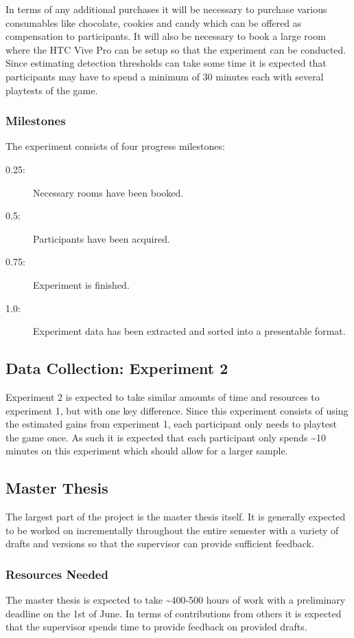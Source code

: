In terms of any additional purchases it will be necessary to purchase various consumables like chocolate, cookies and candy which can be offered as compensation to participants. It will also be necessary to book a large room where the HTC Vive Pro can be setup so that the experiment can be conducted. Since estimating detection thresholds can take some time it is expected that participants may have to spend a minimum of 30 minutes each with several playtests of the game.  

\subsubsection{Milestones}
The experiment consists of four progress milestones:

\begin{description}
\item[0.25: ] Necessary rooms have been booked.
\item[0.5: ] Participants have been acquired.
\item[0.75: ] Experiment is finished.
\item[1.0: ] Experiment data has been extracted and sorted into a presentable format. 
\end{description}

\subsection{Data Collection: Experiment 2}
Experiment 2 is expected to take similar amounts of time and resources to experiment 1, but with one key difference. Since this experiment consists of using the estimated gains from experiment 1, each participant only needs to playtest the game once. As such it is expected that each participant only spends \textasciitilde 10 minutes on this experiment which should allow for a larger sample. 

\subsection{Master Thesis}
The largest part of the project is the master thesis itself. It is generally expected to be worked on incrementally throughout the entire semester with a variety of drafts and versions so that the supervisor can provide sufficient feedback. 

\subsubsection{Resources Needed}
The master thesis is expected to take \textasciitilde 400-500 hours of work with a preliminary deadline on the 1st of June. In terms of contributions from others it is expected that the supervisor spends time to provide feedback on provided drafts. 

